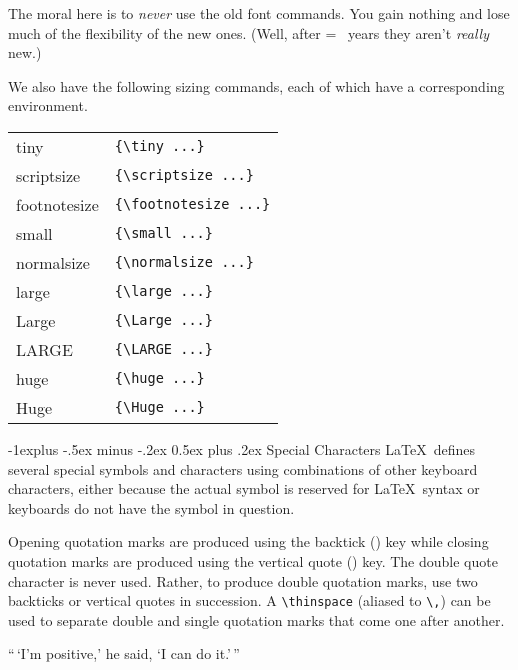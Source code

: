 \documentclass[10pt,landscape,letterpaper]{article}
\makeatletter
\renewcommand{\subsection}{\@startsection{subsection}{2}{0mm}%
	{-1explus -.5ex minus -.2ex}%
	{0.5ex plus .2ex}%
	{\normalfont\normalsize\bfseries}}
\makeatother
\begin{document}
\begin{multicols*}{3}
The moral here is to \textit{never} use the old font commands. You gain nothing and lose much of the flexibility of the new ones. (Well, after 
\newcount\yearsSinceTex
\yearsSinceTex=\numexpr\the{}\relax
\the\yearsSinceTex\ 
years they aren't \textit{really} new.) 

We also have the following sizing commands, each of which have a corresponding environment.

\begin{center}
	\renewcommand{\arraystretch}{1.5}
	\begin{tabular}{|ll|} \hline
		{\tiny tiny} & \verb|{\tiny ...}| \\
		{\scriptsize scriptsize} & \verb|{\scriptsize ...}| \\
		{\footnotesize footnotesize} & \verb|{\footnotesize ...}| \\
		{\small small} & \verb|{\small ...}| \\
		{\normalsize normalsize} & \verb|{\normalsize ...}| \\
		{\large large} & \verb|{\large ...}| \\
		{\Large Large} & \verb|{\Large ...}| \\
		{\LARGE LARGE} & \verb|{\LARGE ...}| \\
		{\huge huge} & \verb|{\huge ...}| \\
		{\Huge Huge} & \verb|{\Huge ...}| \\
		\hline 
	\end{tabular}
\end{center}


\subsection{Special Characters}
\LaTeX\ defines several special symbols and characters using combinations of other keyboard characters, either because the actual symbol is reserved for \LaTeX\ syntax or keyboards do not have the symbol in question.

Opening quotation marks are produced using the backtick (\textasciigrave) key while closing quotation marks are produced using the vertical quote (\textquotesingle) key. The double quote character is never used. Rather, to produce double quotation marks, use two backticks or vertical quotes in succession. A \verb|\thinspace| (aliased to \verb|\,|) can be used to separate double and single quotation marks that come one after another.
\begin{macrocode}
``\,`I'm positive,' he said, `I can do it.'\,''
\end{macrocode}


\end{multicols*}
\end{document}
